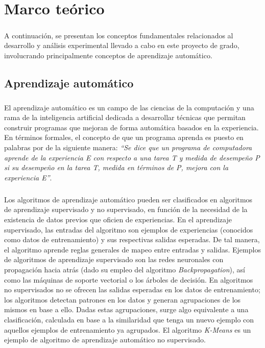 \chapter{Marco teórico} \label{section-marco-teorico} 

\paragraph{} A continuación, se presentan los conceptos fundamentales relacionados al desarrollo y análisis experimental llevado a cabo en este proyecto de grado, involucrando principalmente conceptos de aprendizaje automático.

\section{Aprendizaje automático}

\paragraph{}El aprendizaje automático es un campo de las ciencias de la computación y una rama de la inteligencia artificial dedicada a desarrollar técnicas que permitan construir programas que mejoran de forma automática basados en la experiencia.
En términos formales, el concepto de que un programa aprenda es puesto en palabras por \citet{mitchell1997machine} de la siguiente manera: \textit{“Se dice que un programa de computadora aprende de la experiencia E con respecto a una tarea T y medida de desempeño P si su desempeño en la tarea T, medida en términos de P, mejora con la experiencia E”}. 

\paragraph{}Los algoritmos de aprendizaje automático pueden ser clasificados en algoritmos de aprendizaje supervisado y no supervisado, en función de la necesidad de la existencia de datos previos que oficien de experiencias.
En el aprendizaje supervisado, las entradas del algoritmo son ejemplos de experiencias (conocidos como datos de entrenamiento) y sus respectivas salidas esperadas.
De tal manera, el algoritmo aprende reglas generales de mapeo entre entradas y salidas.
Ejemplos de algoritmos de aprendizaje supervisado son las redes neuronales con propagación hacia atrás (dado su empleo del algoritmo \textit{Backpropagation}), así como las máquinas de soporte vectorial o los árboles de decisión. 
 En algoritmos no supervisados no se ofrecen las salidas esperadas en los datos de entrenamiento; los algoritmos detectan patrones en los datos y generan agrupaciones de los mismos en base a ello.
Dadas estas agrupaciones, surge algo equivalente a una clasificación, calculada en base a la similaridad que tenga un nuevo ejemplo con aquellos ejemplos de entrenamiento ya agrupados.
El algoritmo \textit{K-Means} es un ejemplo de algoritmo de aprendizaje automático no supervisado. 


